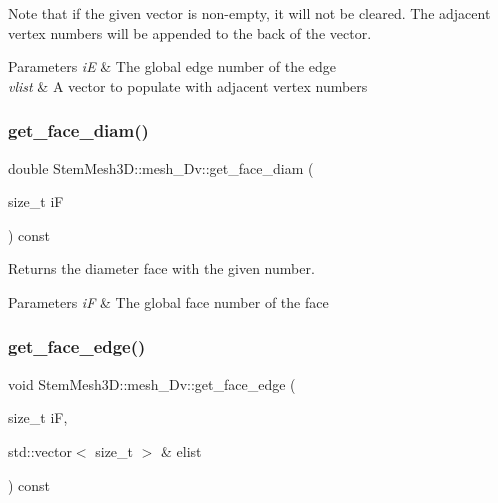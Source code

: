 Note that if the given vector is non-\/empty, it will not be cleared. The adjacent vertex numbers will be appended to the back of the vector. 
\begin{DoxyParams}{Parameters}
{\em iE} & The global edge number of the edge \\
\hline
{\em vlist} & A vector to populate with adjacent vertex numbers \\
\hline
\end{DoxyParams}
\mbox{\label{classStemMesh3D_1_1mesh__3Dv_a8bb48254482f61dc1c6f552f0fa8d7c5}} 
\subsubsection{\texorpdfstring{get\+\_\+face\+\_\+diam()}{get\_face\_diam()}}
{\footnotesize\ttfamily double Stem\+Mesh3\+D\+::mesh\+\_\+Dv\+::get\+\_\+face\+\_\+diam (\begin{DoxyParamCaption}\item[{size\+\_\+t}]{iF }\end{DoxyParamCaption}) const}



Returns the diameter face with the given number. 


\begin{DoxyParams}{Parameters}
{\em iF} & The global face number of the face \\
\hline
\end{DoxyParams}
\mbox{\label{classStemMesh3D_1_1mesh__3Dv_ae1cecbb86f79a41a6e979e6afc32be3f}} 
\subsubsection{\texorpdfstring{get\+\_\+face\+\_\+edge()}{get\_face\_edge()}}
{\footnotesize\ttfamily void Stem\+Mesh3\+D\+::mesh\+\_\+Dv\+::get\+\_\+face\+\_\+edge (\begin{DoxyParamCaption}\item[{size\+\_\+t}]{iF,  }\item[{std\+::vector$<$ size\+\_\+t $>$ \&}]{elist }\end{DoxyParamCaption}) const}



